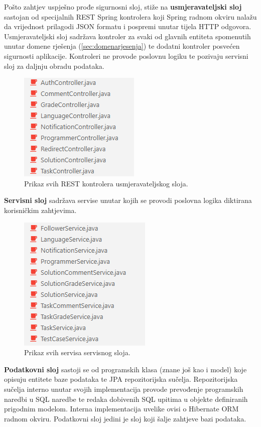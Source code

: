 \documentclass[times, utf8, zavrsni]{fer}
\begin{document}
	 		Pošto zahtjev uspješno prođe sigurnosni sloj, stiže na \textbf{usmjeravateljski sloj} sastojan od specijalnih REST Spring kontrolera koji Spring radnom okviru nalažu da vrijednost prilagodi JSON formatu i pospremi unutar tijela HTTP odgovora. Usmjeravateljski sloj sadržava kontroler za svaki od glavnih entiteta spomenutih unutar domene rješenja (\ref{sec:domenarjesenja}) te dodatni kontroler posvećen sigurnosti aplikacije. Kontroleri ne provode poslovnu logiku te pozivaju servisni sloj za daljnju obradu podataka. 
	 		\begin{figure}[H]
	 			\centering
	 			\includegraphics[scale=0.75]{pictures/prikazi/Controllers.png}
	 			\caption{Prikaz svih REST kontrolera usmjeravateljskog sloja.}
	 			\label{fig:controllers}
	 		\end{figure}
 		
	 		\textbf{Servisni sloj} sadržava servise unutar kojih se provodi poslovna logika diktirana korisničkim zahtjevima.
	 		\begin{figure}[H]
	 			\centering
	 			\includegraphics[scale=0.75]{pictures/prikazi/Services.png}
	 			\caption{Prikaz svih servisa servisnog sloja.}
	 			\label{fig:services}
	 		\end{figure}
 		
	 		\textbf{Podatkovni sloj} sastoji se od programskih klasa (znane još kao i model) koje opisuju entitete baze podataka te JPA repozitorijska  sučelja. Repozitorijska sučelja interno unutar svojih implementacija provode prevođenje programskih naredbi u SQL naredbe te redaka dobivenih SQL upitima u objekte definiranih prigodnim modelom. Interna implementacija uvelike ovisi o Hibernate ORM radnom okviru. Podatkovni sloj jedini je sloj koji šalje zahtjeve bazi podataka.
			
\end{document}
